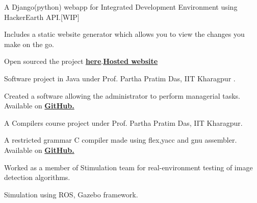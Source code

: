 \documentclass[a4paper, 10pt]{deedy-resume} %
\begin{document}
\begin{minipage}[t]{0.66\textwidth}
  \sectionspace
  
  \runsubsection{}
  \begin{tightitemize}
  \item A Django(python) webapp for Integrated Development Environment using HackerEarth API.[WIP]
  \item Includes a static website generator which allows you to view the changes you make on the go.
  \item Open sourced the project \href{https://github.com/kaustubhhiware/c0derunR}{\bf here}.\href{http://c0derunr.herokuapp.com/}{\bf Hosted website}
  \end{tightitemize}

  \sectionspace
  
  \runsubsection{}
  \begin{tightitemize}
  \item Software project in Java under Prof. Partha Pratim Das, IIT Kharagpur .
  \item Created a software allowing the administrator to perform managerial tasks. Available on \href{https://github.com/kaustubhhiware/DepInfosys}{\bf GitHub.}
  \end{tightitemize}

  \sectionspace

  \runsubsection{}
  \begin{tightitemize}
  \item A Compilers course project under Prof. Partha Pratim Das, IIT Kharagpur.
  \item A restricted grammar C compiler made using flex,yacc and gnu assembler. Available on \href{https://github.com/kaustubhhiware/cOMPILER}{\bf GitHub.}
 \end{tightitemize}

  \sectionspace

  \runsubsection{}
  \begin{tightitemize}
  \item	Worked as a member of Stimulation team for real-environment testing of image detection algorithms.
  \item Simulation using ROS, Gazebo framework.
  \end{tightitemize}


\end{minipage}
\end{document}
